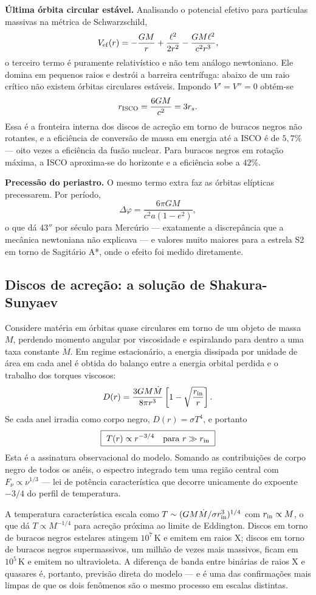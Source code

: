 \documentclass[11pt,a4paper]{article}
\begin{document}
\textbf{Última órbita circular estável.} Analisando o potencial efetivo para partículas massivas na métrica de Schwarzschild,
\[
V_{\rm ef}(r)=-\frac{GM}{r}+\frac{\ell^{2}}{2r^{2}}-\frac{GM\ell^{2}}{c^{2}r^{3}},
\]
o terceiro termo é puramente relativístico e não tem análogo newtoniano. Ele domina em pequenos raios e destrói a barreira centrífuga: abaixo de um raio crítico não existem órbitas circulares estáveis. Impondo $V'=V''=0$ obtém-se
\[
r_{\rm ISCO}=\frac{6GM}{c^{2}}=3r_s.
\]
Essa é a fronteira interna dos discos de acreção em torno de buracos negros não rotantes, e a eficiência de conversão de massa em energia até a ISCO é de $5{,}7\%$ --- oito vezes a eficiência da fusão nuclear. Para buracos negros em rotação máxima, a ISCO aproxima-se do horizonte e a eficiência sobe a $42\%$.

\textbf{Precessão do periastro.} O mesmo termo extra faz as órbitas elípticas precessarem. Por período,
\[
\Delta\varphi=\frac{6\pi GM}{c^{2}a(1-e^{2})},
\]
o que dá $43''$ por século para Mercúrio --- exatamente a discrepância que a mecânica newtoniana não explicava --- e valores muito maiores para a estrela S2 em torno de Sagitário A*, onde o efeito foi medido diretamente.

\subsection*{Discos de acreção: a solução de Shakura-Sunyaev}

Considere matéria em órbitas quase circulares em torno de um objeto de massa $M$, perdendo momento angular por viscosidade e espiralando para dentro a uma taxa constante $\dot{M}$. Em regime estacionário, a energia dissipada por unidade de área em cada anel é obtida do balanço entre a energia orbital perdida e o trabalho dos torques viscosos:
\[
D(r)=\frac{3GM\dot{M}}{8\pi r^{3}}\left[1-\sqrt{\frac{r_{\rm in}}{r}}\right].
\]
Se cada anel irradia como corpo negro, $D(r)=\sigma T^{4}$, e portanto
\[
\boxed{\ T(r)\propto r^{-3/4}\quad\text{para}\ r\gg r_{\rm in}\ }
\]
Esta é a assinatura observacional do modelo. Somando as contribuições de corpo negro de todos os anéis, o espectro integrado tem uma região central com $F_\nu\propto\nu^{1/3}$ --- lei de potência característica que decorre unicamente do expoente $-3/4$ do perfil de temperatura.

A temperatura característica escala como $T\sim(GM\dot{M}/\sigma r_{\rm in}^{3})^{1/4}$ com $r_{\rm in}\propto M$, o que dá $T\propto M^{-1/4}$ para acreção próxima ao limite de Eddington. Discos em torno de buracos negros estelares atingem $10^{7}\,\mathrm{K}$ e emitem em raios X; discos em torno de buracos negros supermassivos, um milhão de vezes mais massivos, ficam em $10^{5}\,\mathrm{K}$ e emitem no ultravioleta. A diferença de banda entre binárias de raios X e quasares é, portanto, previsão direta do modelo --- e é uma das confirmações mais limpas de que os dois fenômenos são o mesmo processo em escalas distintas.
\end{document}
